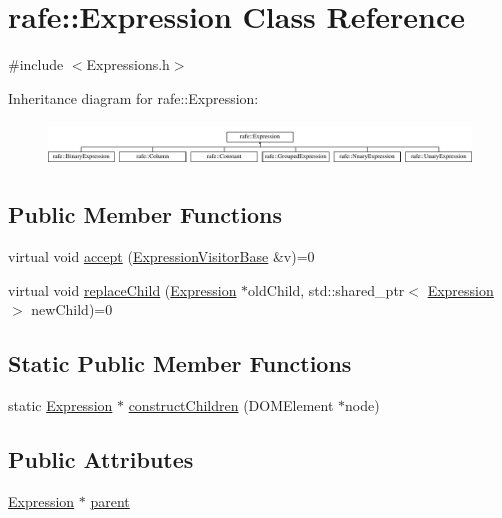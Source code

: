 \hypertarget{classrafe_1_1_expression}{\section{rafe\+:\+:Expression Class Reference}
\label{classrafe_1_1_expression}
}


{\ttfamily \#include $<$Expressions.\+h$>$}

Inheritance diagram for rafe\+:\+:Expression\+:\begin{figure}[H]
\begin{center}
\leavevmode
\includegraphics[height=1.166667cm]{classrafe_1_1_expression}
\end{center}
\end{figure}
\subsection*{Public Member Functions}
\begin{DoxyCompactItemize}
\item 
virtual void \hyperlink{classrafe_1_1_expression_a3b2e5bae8b99ea6c9a3c92a9b949b3cd}{accept} (\hyperlink{classrafe_1_1_expression_visitor_base}{Expression\+Visitor\+Base} \&v)=0
\item 
virtual void \hyperlink{classrafe_1_1_expression_a841879e8eb85f4bb68cfeec24231a701}{replace\+Child} (\hyperlink{classrafe_1_1_expression}{Expression} $\ast$old\+Child, std\+::shared\+\_\+ptr$<$ \hyperlink{classrafe_1_1_expression}{Expression} $>$ new\+Child)=0
\end{DoxyCompactItemize}
\subsection*{Static Public Member Functions}
\begin{DoxyCompactItemize}
\item 
static \hyperlink{classrafe_1_1_expression}{Expression} $\ast$ \hyperlink{classrafe_1_1_expression_a0a965630279f0a68f580a79fe6c5aabc}{construct\+Children} (D\+O\+M\+Element $\ast$node)
\end{DoxyCompactItemize}
\subsection*{Public Attributes}
\begin{DoxyCompactItemize}
\item 
\hyperlink{classrafe_1_1_expression}{Expression} $\ast$ \hyperlink{classrafe_1_1_expression_ae6f0ee539cc324899c34926733fe33b1}{parent}
\end{DoxyCompactItemize}


